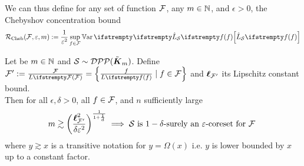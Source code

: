 





\begin{tcolorbox}[colback=red!75, title=Useless?]
	
	We can thus define for any set of function $\mathcal{F}$, any $m\in \mathbb{N}$, and $\epsilon>0$, the Chebyshov concentration bound
	\begin{equation*}
		\boundrate_{\textrm{Cheb}}(\qset, \epsilon, m) := \frac{1}{\epsilon^2} \sup_{\query \in \qset} \Var{}{\estloss{\mathcal{S}}{\query}}
	\end{equation*}
	
	
	\begin{tcolorbox}
		\begin{theorem}
			Let be $m\in \mathbb{N}$ and $\mathcal{S} \sim  \mathcal{DPP}(\tilde{\boldsymbol K}_{m})$. 
			Define $\qset':=\frac{\qset}{\loss{\qset}}=\left\{\frac{\query}{\loss{\query}}\mid \query \in \qset\right\}$ and $\boldsymbol\ell_{\mathcal{F}'}$ its Lipschitz constant bound.\\
	
			Then for all $\epsilon, \delta >0$, all $f \in \mathcal{F}$, and $n$ sufficiently large
			\begin{equation}
				m \gtrsim \left(\frac{\boldsymbol\ell^2_{\mathcal{F}'}}{\delta\varepsilon^2} \right)^{\frac{1}{1+\frac 1 d}} \implies \text{$\mathcal{S}$ is $1-\delta$-surely an $\varepsilon$-coreset for $\mathcal{F}$ }
			\end{equation}
			where $y \gtrsim x$ is a transitive notation for $y = \Omega(x)$ i.e. $y$ is lower bounded by $x$ up to a constant factor.
		\end{theorem}
	\end{tcolorbox}
	

\end{tcolorbox}
